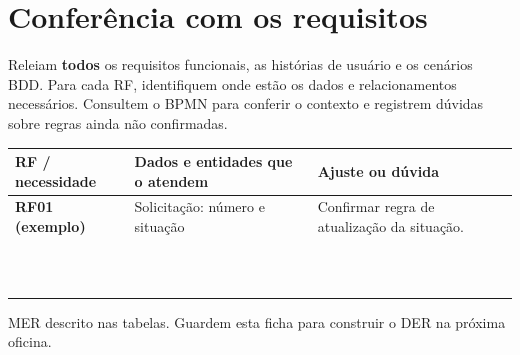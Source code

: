 \section{Conferência com os requisitos}

Releiam \textbf{todos} os requisitos funcionais, as histórias de usuário e os cenários BDD.
Para cada RF, identifiquem onde estão os dados e relacionamentos necessários. Consultem o BPMN
para conferir o contexto e registrem dúvidas sobre regras ainda não confirmadas.

\begin{table}[!ht]
\centering
\small
\setlength{\tabcolsep}{4pt}
\renewcommand{\arraystretch}{1.8}
\begin{tabularx}{\linewidth}{|>{\raggedright\arraybackslash}p{3cm}
                              |>{\raggedright\arraybackslash}X
                              |>{\raggedright\arraybackslash}X|}
\hline
\textbf{RF / necessidade} &
\textbf{Dados e entidades que o atendem} &
\textbf{Ajuste ou dúvida} \\
\hline
\textbf{RF01 (exemplo)} &
Solicitação: número e situação &
Confirmar regra de atualização da situação. \\
\hline
 & & \\ \hline
 & & \\ \hline
 & & \\ \hline
 & & \\ \hline
 & & \\ \hline
 & & \\ \hline
 & & \\ \hline
 & & \\ \hline
 & & \\ \hline
 & & \\ \hline
 & & \\ \hline
\end{tabularx}
\end{table}

\begin{notebox}
MER descrito nas tabelas. Guardem esta ficha para construir o DER na próxima oficina.
\end{notebox}
